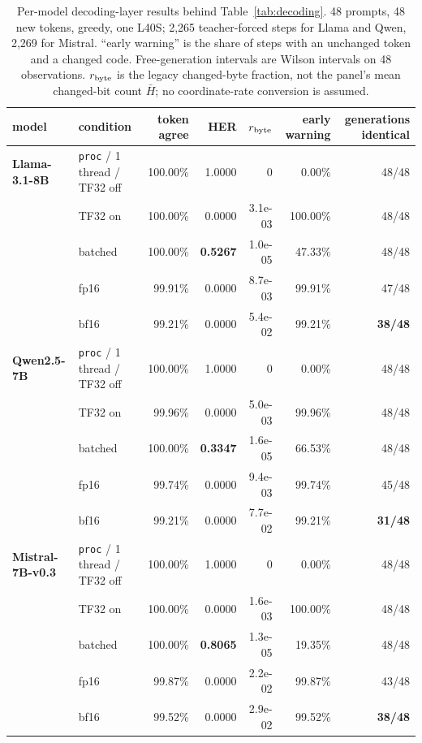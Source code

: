 \documentclass{article}
\begin{document}
\begin{table}[h]
\centering\caption{Per-model decoding-layer results behind Table~\ref{tab:decoding}. 48 prompts, 48 new tokens, greedy, one L40S; 2{,}265 teacher-forced steps for Llama and Qwen, 2{,}269 for Mistral. ``early warning'' is the share of steps with an unchanged token and a changed code. Free-generation intervals are Wilson intervals on 48 observations. $r_{\rm byte}$ is the legacy changed-byte fraction, not the panel's mean changed-bit count $\bar H$; no coordinate-rate conversion is assumed.}\label{tab:decfull}\scriptsize\setlength{\tabcolsep}{3.5pt}
\begin{tabular}{llrrrrr}
\toprule
model & condition & token agree & HER & $r_{\rm byte}$ & early warning & generations identical \\
\midrule
\textbf{Llama-3.1-8B} & \texttt{proc} / 1 thread / TF32 off & 100.00\% & 1.0000 & 0 & 0.00\% & 48/48 \\
 & TF32 on & 100.00\% & 0.0000 & 3.1e-03 & 100.00\% & 48/48 \\
 & batched & 100.00\% & \textbf{0.5267} & 1.0e-05 & 47.33\% & 48/48 \\
 & fp16 & 99.91\% & 0.0000 & 8.7e-03 & 99.91\% & 47/48 \\
 & bf16 & 99.21\% & 0.0000 & 5.4e-02 & 99.21\% & \textbf{38/48} \\
\textbf{Qwen2.5-7B} & \texttt{proc} / 1 thread / TF32 off & 100.00\% & 1.0000 & 0 & 0.00\% & 48/48 \\
 & TF32 on & 99.96\% & 0.0000 & 5.0e-03 & 99.96\% & 48/48 \\
 & batched & 100.00\% & \textbf{0.3347} & 1.6e-05 & 66.53\% & 48/48 \\
 & fp16 & 99.74\% & 0.0000 & 9.4e-03 & 99.74\% & 45/48 \\
 & bf16 & 99.21\% & 0.0000 & 7.7e-02 & 99.21\% & \textbf{31/48} \\
\textbf{Mistral-7B-v0.3} & \texttt{proc} / 1 thread / TF32 off & 100.00\% & 1.0000 & 0 & 0.00\% & 48/48 \\
 & TF32 on & 100.00\% & 0.0000 & 1.6e-03 & 100.00\% & 48/48 \\
 & batched & 100.00\% & \textbf{0.8065} & 1.3e-05 & 19.35\% & 48/48 \\
 & fp16 & 99.87\% & 0.0000 & 2.2e-02 & 99.87\% & 43/48 \\
 & bf16 & 99.52\% & 0.0000 & 2.9e-02 & 99.52\% & \textbf{38/48} \\
\bottomrule
\end{tabular}
\end{table}
\end{document}

